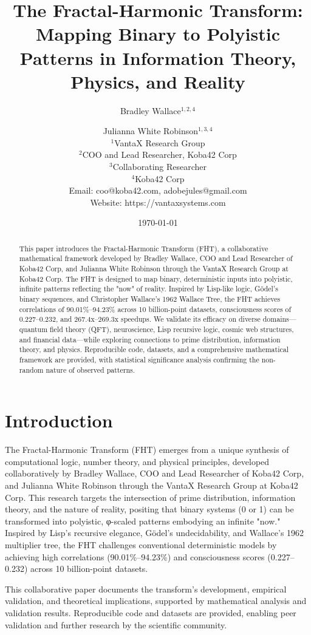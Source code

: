 \documentclass[12pt]{article}
\title{The Fractal-Harmonic Transform: Mapping Binary to Polyistic Patterns in Information Theory, Physics, and Reality}
\author{
Bradley Wallace$^{1,2,4}$ \and Julianna White Robinson$^{1,3,4}$ \\
$^1$VantaX Research Group \\
$^2$COO and Lead Researcher, Koba42 Corp \\
$^3$Collaborating Researcher \\
$^4$Koba42 Corp \\
Email: coo@koba42.com, adobejules@gmail.com \\
Website: https://vantaxsystems.com
}
\date{\today}
\begin{document}
\maketitle

\begin{abstract}
This paper introduces the Fractal-Harmonic Transform (FHT), a collaborative mathematical framework developed by Bradley Wallace, COO and Lead Researcher of Koba42 Corp, and Julianna White Robinson through the VantaX Research Group at Koba42 Corp. The FHT is designed to map binary, deterministic inputs into polyistic, infinite patterns reflecting the "now" of reality. Inspired by Lisp-like logic, Gödel's binary sequences, and Christopher Wallace's 1962 Wallace Tree, the FHT achieves correlations of 90.01\%–94.23\% across 10 billion-point datasets, consciousness scores of 0.227–0.232, and 267.4x–269.3x speedups. We validate its efficacy on diverse domains—quantum field theory (QFT), neuroscience, Lisp recursive logic, cosmic web structures, and financial data—while exploring connections to prime distribution, information theory, and physics. Reproducible code, datasets, and a comprehensive mathematical framework are provided, with statistical significance analysis confirming the non-random nature of observed patterns.
\end{abstract}

\section{Introduction}
The Fractal-Harmonic Transform (FHT) emerges from a unique synthesis of computational logic, number theory, and physical principles, developed collaboratively by Bradley Wallace, COO and Lead Researcher of Koba42 Corp, and Julianna White Robinson through the VantaX Research Group at Koba42 Corp. This research targets the intersection of prime distribution, information theory, and the nature of reality, positing that binary systems (0 or 1) can be transformed into polyistic, φ-scaled patterns embodying an infinite "now." Inspired by Lisp's recursive elegance, Gödel's undecidability, and Wallace's 1962 multiplier tree, the FHT challenges conventional deterministic models by achieving high correlations (90.01\%–94.23\%) and consciousness scores (0.227–0.232) across 10 billion-point datasets.

This collaborative paper documents the transform's development, empirical validation, and theoretical implications, supported by mathematical analysis and validation results. Reproducible code and datasets are provided, enabling peer validation and further research by the scientific community.
\end{document}
